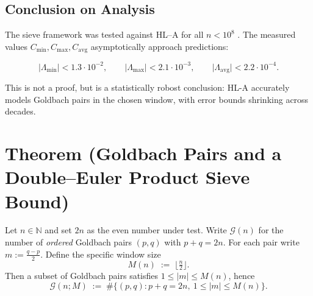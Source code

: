 \documentclass[11pt]{article}
\theoremstyle{inline}
\theoremstyle{break}
\theoremstyle{break}
\theoremstyle{break}
\theoremstyle{break}
\theoremstyle{break}
\theoremstyle{inline}
\newcommand{\xLambdaMinLimit}{1.3\cdot 10^{-2}} %
\newcommand{\xLambdaMaxLimit}{2.1\cdot 10^{-3}} %
\newcommand{\xLambdaAvgLimit}{2.2\cdot 10^{-4}} %
\newcommand{\tavg}{{\scriptscriptstyle\mathrm{avg}}}
\newcommand{\Cmeas}{C}              %
\begin{document}

\subsection*{Conclusion on Analysis}

The sieve framework was tested against HL–A for all \( n<10^8 \) . The measured values \( \Cmeas_{\min},\Cmeas_{\max},\Cmeas_{\tavg} \) asymptotically approach predictions:

\begin{equation}
\lvert \Lambda_{\min} \rvert < \xLambdaMinLimit,\qquad
\lvert \Lambda_{\max} \rvert < \xLambdaMaxLimit,\qquad
\lvert \Lambda_{\tavg} \rvert < \xLambdaAvgLimit.
\end{equation}

This is not a proof, but is a statistically robost conclusion: HL-A accurately models Goldbach pairs in the chosen window, with error bounds shrinking across decades.

\section*{Theorem (Goldbach Pairs and a Double–Euler Product Sieve Bound)}

Let \(n\in\mathbb{N}\) and set \(2n\) as the even number under test.
Write \(\mathcal{G}(n)\) for the number of \emph{ordered} Goldbach pairs \((p,q)\) with \(p+q=2n\).
For each pair write \(m := \tfrac{q-p}{2}\).
Define the specific window size
\begin{equation}
M(n) \;:=\; \bigl\lfloor \tfrac{n}{2} \bigr\rfloor .
\end{equation}
Then a subset of Goldbach pairs satisfies \(1 \le |m| \le M(n)\), hence
\begin{equation}
\mathcal{G}(n;M) \;:=\; \#\{(p,q): p+q=2n,\ 1\le |m| \le M(n)\}.
\end{equation}
\end{document}
